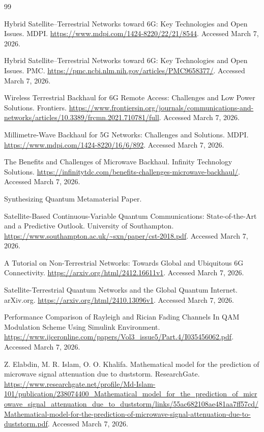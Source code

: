 \documentclass[11pt,a4paper]{article}
\begin{document}
\begin{thebibliography}{99}

 Hybrid Satellite--Terrestrial Networks toward 6G: Key Technologies and Open Issues. MDPI. \url{https://www.mdpi.com/1424-8220/22/21/8544}. Accessed March 7, 2026.

 Hybrid Satellite--Terrestrial Networks toward 6G: Key Technologies and Open Issues. PMC. \url{https://pmc.ncbi.nlm.nih.gov/articles/PMC9658377/}. Accessed March 7, 2026.

 Wireless Terrestrial Backhaul for 6G Remote Access: Challenges and Low Power Solutions. Frontiers. \url{https://www.frontiersin.org/journals/communications-and-networks/articles/10.3389/frcmn.2021.710781/full}. Accessed March 7, 2026.

 Millimetre-Wave Backhaul for 5G Networks: Challenges and Solutions. MDPI. \url{https://www.mdpi.com/1424-8220/16/6/892}. Accessed March 7, 2026.

 The Benefits and Challenges of Microwave Backhaul. Infinity Technology Solutions. \url{https://infinitytdc.com/benefits-challenges-microwave-backhaul/}. Accessed March 7, 2026.

 Synthesizing Quantum Metamaterial Paper.

 Satellite-Based Continuous-Variable Quantum Communications: State-of-the-Art and a Predictive Outlook. University of Southampton. \url{https://www.southampton.ac.uk/~sxn/paper/cst-2018.pdf}. Accessed March 7, 2026.

 A Tutorial on Non-Terrestrial Networks: Towards Global and Ubiquitous 6G Connectivity. \url{https://arxiv.org/html/2412.16611v1}. Accessed March 7, 2026.

 Satellite-Terrestrial Quantum Networks and the Global Quantum Internet. arXiv.org. \url{https://arxiv.org/html/2410.13096v1}. Accessed March 7, 2026.

 Performance Comparison of Rayleigh and Rician Fading Channels In QAM Modulation Scheme Using Simulink Environment. \url{https://www.ijceronline.com/papers/Vol3_issue5/Part.4/I035456062.pdf}. Accessed March 7, 2026.

 Z. Elabdin, M. R. Islam, O. O. Khalifa. Mathematical model for the prediction of microwave signal attenuation due to duststorm. ResearchGate. \url{https://www.researchgate.net/profile/Md-Islam-101/publication/238074400_Mathematical_model_for_the_prediction_of_microwave_signal_attenuation_due_to_duststorm/links/55ac682108ae481aa7ff57cd/Mathematical-model-for-the-prediction-of-microwave-signal-attenuation-due-to-duststorm.pdf}. Accessed March 7, 2026.


\end{thebibliography}
\end{document}
